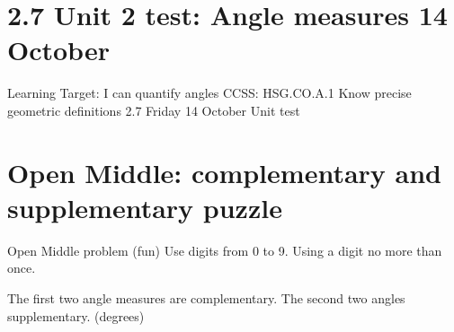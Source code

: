 \documentclass[onlytextwidth]{beamer}
\begin{document}
\section{2.7 Unit 2 test: Angle measures \hfill 14 October}
\begin{frame}{Learning Target: I can quantify angles}
  {CCSS: HSG.CO.A.1 Know precise geometric definitions \hfill \alert{2.7 Friday 14 October}}
    \alert{Unit test}
  \end{frame}

\section{Open Middle: complementary and supplementary puzzle}
\begin{frame}{Open Middle problem (fun)}
  {Use digits from 0 to 9. Using a digit no more than once.}
    \begin{block}{The first two angle measures are complementary. The second two angles supplementary. (degrees)}
      \begin{center}
    \end{center}
    \end{block} \vspace{1cm} 
\end{frame}
\end{document}
